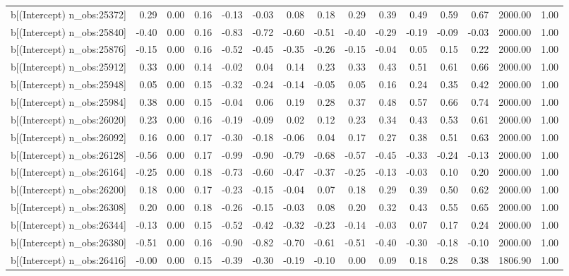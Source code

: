 \begin{table}[ht]
\begin{tabular}{rrrrrrrrrrrrrrr}
  b[(Intercept) n\_obs:25372] & 0.29 & 0.00 & 0.16 & -0.13 & -0.03 & 0.08 & 0.18 & 0.29 & 0.39 & 0.49 & 0.59 & 0.67 & 2000.00 & 1.00 \\ 
  b[(Intercept) n\_obs:25840] & -0.40 & 0.00 & 0.16 & -0.83 & -0.72 & -0.60 & -0.51 & -0.40 & -0.29 & -0.19 & -0.09 & -0.03 & 2000.00 & 1.00 \\ 
  b[(Intercept) n\_obs:25876] & -0.15 & 0.00 & 0.16 & -0.52 & -0.45 & -0.35 & -0.26 & -0.15 & -0.04 & 0.05 & 0.15 & 0.22 & 2000.00 & 1.00 \\ 
  b[(Intercept) n\_obs:25912] & 0.33 & 0.00 & 0.14 & -0.02 & 0.04 & 0.14 & 0.23 & 0.33 & 0.43 & 0.51 & 0.61 & 0.66 & 2000.00 & 1.00 \\ 
  b[(Intercept) n\_obs:25948] & 0.05 & 0.00 & 0.15 & -0.32 & -0.24 & -0.14 & -0.05 & 0.05 & 0.16 & 0.24 & 0.35 & 0.42 & 2000.00 & 1.00 \\ 
  b[(Intercept) n\_obs:25984] & 0.38 & 0.00 & 0.15 & -0.04 & 0.06 & 0.19 & 0.28 & 0.37 & 0.48 & 0.57 & 0.66 & 0.74 & 2000.00 & 1.00 \\ 
  b[(Intercept) n\_obs:26020] & 0.23 & 0.00 & 0.16 & -0.19 & -0.09 & 0.02 & 0.12 & 0.23 & 0.34 & 0.43 & 0.53 & 0.61 & 2000.00 & 1.00 \\ 
  b[(Intercept) n\_obs:26092] & 0.16 & 0.00 & 0.17 & -0.30 & -0.18 & -0.06 & 0.04 & 0.17 & 0.27 & 0.38 & 0.51 & 0.63 & 2000.00 & 1.00 \\ 
  b[(Intercept) n\_obs:26128] & -0.56 & 0.00 & 0.17 & -0.99 & -0.90 & -0.79 & -0.68 & -0.57 & -0.45 & -0.33 & -0.24 & -0.13 & 2000.00 & 1.00 \\ 
  b[(Intercept) n\_obs:26164] & -0.25 & 0.00 & 0.18 & -0.73 & -0.60 & -0.47 & -0.37 & -0.25 & -0.13 & -0.03 & 0.10 & 0.20 & 2000.00 & 1.00 \\ 
  b[(Intercept) n\_obs:26200] & 0.18 & 0.00 & 0.17 & -0.23 & -0.15 & -0.04 & 0.07 & 0.18 & 0.29 & 0.39 & 0.50 & 0.62 & 2000.00 & 1.00 \\ 
  b[(Intercept) n\_obs:26308] & 0.20 & 0.00 & 0.18 & -0.26 & -0.15 & -0.03 & 0.08 & 0.20 & 0.32 & 0.43 & 0.55 & 0.65 & 2000.00 & 1.00 \\ 
  b[(Intercept) n\_obs:26344] & -0.13 & 0.00 & 0.15 & -0.52 & -0.42 & -0.32 & -0.23 & -0.14 & -0.03 & 0.07 & 0.17 & 0.24 & 2000.00 & 1.00 \\ 
  b[(Intercept) n\_obs:26380] & -0.51 & 0.00 & 0.16 & -0.90 & -0.82 & -0.70 & -0.61 & -0.51 & -0.40 & -0.30 & -0.18 & -0.10 & 2000.00 & 1.00 \\ 
  b[(Intercept) n\_obs:26416] & -0.00 & 0.00 & 0.15 & -0.39 & -0.30 & -0.19 & -0.10 & 0.00 & 0.09 & 0.18 & 0.28 & 0.38 & 1806.90 & 1.00 \\ 

\end{tabular}
\end{table}
